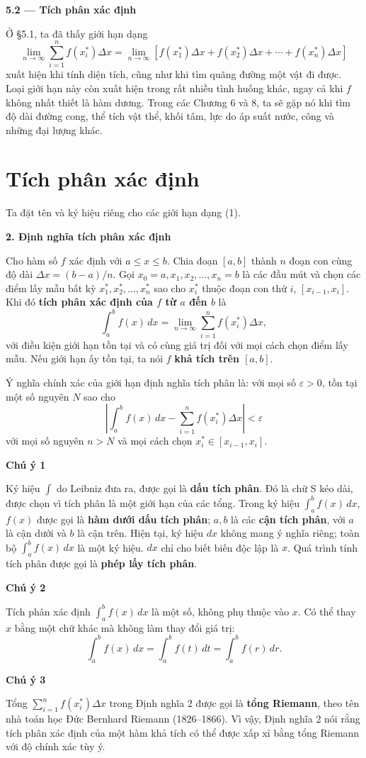 \documentclass[12pt,a4paper]{article}
\newcommand{\group}[1]{\par\medskip\noindent\textbf{#1}\par\nopagebreak[4]}
\begin{document}
\begin{center}{\LARGE\bfseries 5.2 — Tích phân xác định}\end{center}
Ở §5.1, ta đã thấy giới hạn dạng
\[\lim_{n\to\infty}\sum_{i=1}^n f(x_i^*)\Delta x=\lim_{n\to\infty}[f(x_1^*)\Delta x+f(x_2^*)\Delta x+\cdots+f(x_n^*)\Delta x]\tag{1}\]
xuất hiện khi tính diện tích, cũng như khi tìm quãng đường một vật đi được. Loại giới hạn này còn xuất hiện trong rất nhiều tình huống khác, ngay cả khi $f$ không nhất thiết là hàm dương. Trong các Chương 6 và 8, ta sẽ gặp nó khi tìm độ dài đường cong, thể tích vật thể, khối tâm, lực do áp suất nước, công và những đại lượng khác.
\section*{Tích phân xác định}
Ta đặt tên và ký hiệu riêng cho các giới hạn dạng (1).
\group{2. Định nghĩa tích phân xác định} Cho hàm số $f$ xác định với $a\le x\le b$. Chia đoạn $[a,b]$ thành $n$ đoạn con cùng độ dài $\Delta x=(b-a)/n$. Gọi $x_0=a,x_1,x_2,\ldots,x_n=b$ là các đầu mút và chọn các điểm lấy mẫu bất kỳ $x_1^*,x_2^*,\ldots,x_n^*$ sao cho $x_i^*$ thuộc đoạn con thứ $i$, $[x_{i-1},x_i]$. Khi đó \textbf{tích phân xác định của $f$ từ $a$ đến $b$} là
\[\int_a^b f(x)\,dx=\lim_{n\to\infty}\sum_{i=1}^n f(x_i^*)\Delta x,\tag{2}\]
với điều kiện giới hạn tồn tại và có cùng giá trị đối với mọi cách chọn điểm lấy mẫu. Nếu giới hạn ấy tồn tại, ta nói $f$ \textbf{khả tích trên $[a,b]$}.

Ý nghĩa chính xác của giới hạn định nghĩa tích phân là: với mọi số $\varepsilon>0$, tồn tại một số nguyên $N$ sao cho
\[\left|\int_a^b f(x)\,dx-\sum_{i=1}^n f(x_i^*)\Delta x\right|<\varepsilon\]
với mọi số nguyên $n>N$ và mọi cách chọn $x_i^*\in[x_{i-1},x_i]$.
\group{Chú ý 1} Ký hiệu $\int$ do Leibniz đưa ra, được gọi là \textbf{dấu tích phân}. Đó là chữ S kéo dài, được chọn vì tích phân là một giới hạn của các tổng. Trong ký hiệu $\int_a^b f(x)\,dx$, $f(x)$ được gọi là \textbf{hàm dưới dấu tích phân}; $a,b$ là các \textbf{cận tích phân}, với $a$ là cận dưới và $b$ là cận trên. Hiện tại, ký hiệu $dx$ không mang ý nghĩa riêng; toàn bộ $\int_a^b f(x)\,dx$ là một ký hiệu. $dx$ chỉ cho biết biến độc lập là $x$. Quá trình tính tích phân được gọi là \textbf{phép lấy tích phân}.
\group{Chú ý 2} Tích phân xác định $\int_a^b f(x)\,dx$ là một số, không phụ thuộc vào $x$. Có thể thay $x$ bằng một chữ khác mà không làm thay đổi giá trị:
\[\int_a^b f(x)\,dx=\int_a^b f(t)\,dt=\int_a^b f(r)\,dr.\]
\group{Chú ý 3} Tổng $\sum_{i=1}^n f(x_i^*)\Delta x$ trong Định nghĩa 2 được gọi là \textbf{tổng Riemann}, theo tên nhà toán học Đức Bernhard Riemann (1826–1866). Vì vậy, Định nghĩa 2 nói rằng tích phân xác định của một hàm khả tích có thể được xấp xỉ bằng tổng Riemann với độ chính xác tùy ý.
\end{document}
